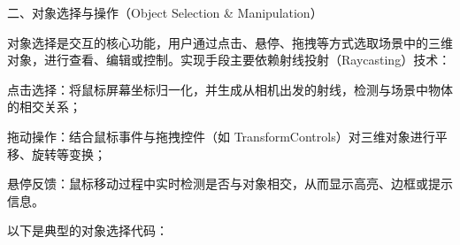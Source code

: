\begin{Shaded}
\begin{Highlighting}[]
\OperatorTok{=} \OperatorTok{,}\NormalTok{)}\OperatorTok{;}

 \OperatorTok{=} \OperatorTok{;} 

 \OperatorTok{=} \OperatorTok{;} 
\end{Highlighting}
\end{Shaded}

二、对象选择与操作（Object Selection \& Manipulation）

对象选择是交互的核心功能，用户通过点击、悬停、拖拽等方式选取场景中的三维对象，进行查看、编辑或控制。实现手段主要依赖射线投射（Raycasting）技术：

点击选择：将鼠标屏幕坐标归一化，并生成从相机出发的射线，检测与场景中物体的相交关系；

拖动操作：结合鼠标事件与拖拽控件（如 TransformControls）对三维对象进行平移、旋转等变换；

悬停反馈：鼠标移动过程中实时检测是否与对象相交，从而显示高亮、边框或提示信息。

以下是典型的对象选择代码：

